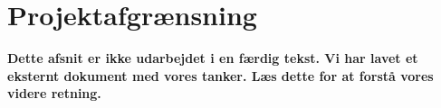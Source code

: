 \section{Projektafgrænsning}
\textbf{Dette afsnit er ikke udarbejdet i en færdig tekst. Vi har lavet et eksternt dokument med vores tanker. Læs dette for at forstå vores videre retning.} 